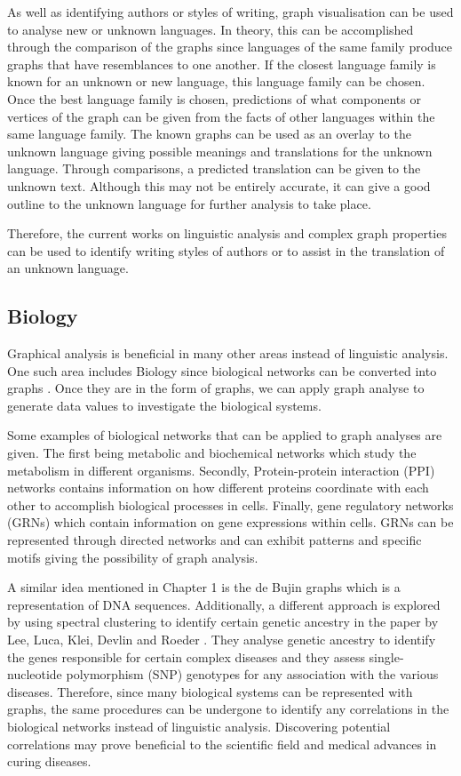As well as identifying authors or styles of writing, graph visualisation can be used to analyse new or unknown languages. In theory, this can be accomplished through the comparison of the graphs since languages of the same family produce graphs that have resemblances to one another. If the closest language family is known for an unknown or new language, this language family can be chosen. Once the best language family is chosen, predictions of what components or vertices of the graph can be given from the facts of other languages within the same language family. The known graphs can be used as an overlay to the unknown language giving possible meanings and translations for the unknown language. Through comparisons, a predicted translation can be given to the unknown text. Although this may not be entirely accurate, it can give a good outline to the unknown language for further analysis to take place.

Therefore, the current works on linguistic analysis and complex graph properties can be used to identify writing styles of authors or to assist in the translation of an unknown language.

\subsection{Biology}
Graphical analysis is beneficial in many other areas instead of linguistic analysis. One such area includes Biology since biological networks can be converted into graphs \cite{lesne2006complex}. Once they are in the form of graphs, we can apply graph analyse to generate data values to investigate the biological systems. 

Some examples of biological networks \cite{pavlopoulos2011using} that can be applied to graph analyses are given. The first being metabolic and biochemical networks which study the metabolism in different organisms. Secondly, Protein-protein interaction (PPI) networks contains information on how different proteins coordinate with each other to accomplish biological processes in cells. Finally, gene regulatory networks (GRNs) which contain information on gene expressions within cells. GRNs can be represented through directed networks and can exhibit patterns and specific motifs giving the possibility of graph analysis. 

A similar idea mentioned in Chapter 1 is the de Bujin graphs which is a representation of DNA sequences. Additionally, a different approach is explored by using spectral clustering to identify certain genetic ancestry in the paper by Lee, Luca, Klei, Devlin and Roeder \cite{lee2010discovering}. They analyse genetic ancestry to identify the genes responsible for certain complex diseases and they assess single-nucleotide polymorphism (SNP) genotypes for any association with the various diseases. Therefore, since many biological systems can be represented with graphs, the same procedures can be undergone to identify any correlations in the biological networks instead of linguistic analysis. Discovering potential correlations may prove beneficial to the scientific field and medical advances in curing diseases.

